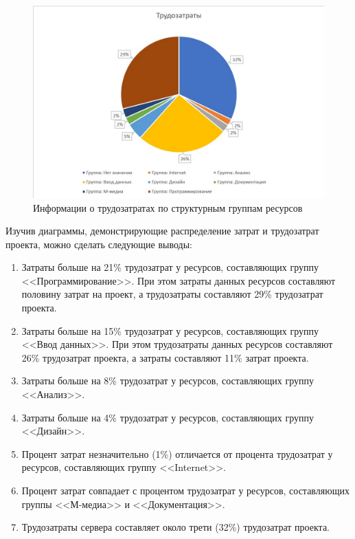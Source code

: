 \begin{figure}[H]
	\begin{center}
		\includegraphics[scale=0.5]{inc/img/task3-labor-costs-graph.jpg}
	\end{center}
	\captionsetup{justification=centering}
	\caption{Информации о трудозатратах по структурным группам ресурсов}
	\label{img:task3-labor-costs-graph}
\end{figure}

Изучив диаграммы, демонстрирующие распределение затрат и трудозатрат проекта, можно сделать следующие выводы:
\begin{enumerate}
	\item Затраты больше на 21\% трудозатрат у ресурсов, составляющих группу <<Программирование>>. При этом затраты данных ресурсов составляют половину затрат на проект, а трудозатраты составляют 29\% трудозатрат проекта.
	\item Затраты больше на 15\% трудозатрат у ресурсов, составляющих группу <<Ввод данных>>. При этом трудозатраты данных ресурсов составляют 26\% трудозатрат проекта, а затраты составляют 11\% затрат проекта.
	\item Затраты больше на 8\% трудозатрат у ресурсов, составляющих группу <<Анализ>>.
	\item Затраты больше на 4\% трудозатрат у ресурсов, составляющих группу <<Дизайн>>.
	\item Процент затрат незначительно (1\%) отличается от процента трудозатрат у ресурсов, составляющих группу <<Internet>>.
	\item Процент затрат совпадает с процентом трудозатрат у ресурсов, составляющих группы <<М-медиа>> и <<Документация>>.
	\item Трудозатраты сервера составляет около трети (32\%) трудозатрат проекта.
\end{enumerate}

